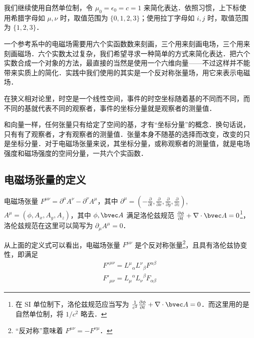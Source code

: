 

我们继续使用自然单位制，令 $\mu_0=\epsilon_0=c=1$ 来简化表达．依照习惯，上下标使用希腊字母如 $\mu, \nu$ 时，取值范围为 $\{0, 1, 2, 3\}$；使用拉丁字母如 $i, j$ 时，取值范围为 $\{1, 2, 3\}$．

一个参考系中的电磁场需要用六个实函数数来刻画，三个用来刻画电场，三个用来刻画磁场．六个实数太过复杂，我们希望寻求一种简单的方式来简化表达．把六个实数合成一个对象的方法，最直接的当然是使用一个六维向量——不过这样并不能带来实质上的简化．实践中我们使用的其实是一个反对称张量场，用它来表示电磁场．

在狭义相对论里，时空是一个线性空间，事件的时空坐标随着基的不同而不同，而不同的基就代表不同的观察者，事件的坐标分量就是观察者的测量值．

和向量一样，任何张量只有给定了空间的基，才有“坐标分量”的概念．换句话说，只有有了观察者，才有观察者的测量值．张量本身不随基的选择而改变，改变的只是坐标分量．对于电磁场张量来说，其坐标分量，或称观察者的测量值，就是电场强度和磁场强度的空间分量，一共六个实函数．

\subsection{电磁场张量的定义}
\begin{definition}{电磁场张量}
$F^{\mu\nu}=\partial^{\mu}A^{\nu}-\partial^{\nu}A^{\mu}$，其中 $\partial^{\mu}=(-\frac{\partial}{\partial t},\frac{\partial}{\partial x},\frac{\partial}{\partial y},\frac{\partial}{\partial z})$,$A^{\mu}=(\phi,A_x,A_y,A_z)$，其中 $\phi,\bvec A$ 满足洛伦兹规范 $\frac{\partial \phi}{\partial t}+\nabla \cdot \bvec A=0$\footnote{在 SI 单位制下，洛伦兹规范应当写为 $\frac{1}{c^2}\frac{\partial \phi}{\partial t}+\nabla \cdot \bvec A=0$．而这里用的是自然单位制，将 $1/c^2$ 略去．}，洛伦兹规范在这里可以简写为 $\partial_\mu A^{\mu}=0$．
\end{definition}
从上面的定义式可以看出，电磁场张量 $F^{\mu\nu}$ 是个反对称张量\footnote{“反对称”意味着 $F^{\mu\nu}=-F^{\nu\mu}$．}，且具有洛伦兹协变性，即满足
\begin{equation}\label{EMFT_eq4}
\begin{aligned}
&F'^{\mu\nu}={L^\mu}_\alpha {L^\nu}_\beta F^{\alpha\beta}\\
&F'_{\mu\nu}={L_\mu}^\alpha {L_\nu}^\beta F_{\alpha\beta}
\end{aligned}
\end{equation}

